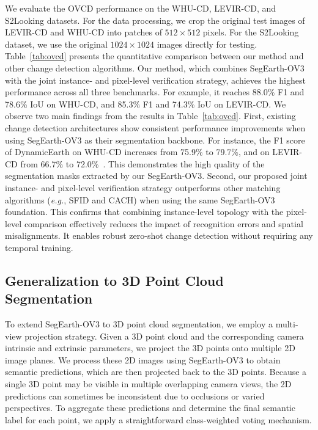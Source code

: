 \documentclass[twocolumn,switch,times]{article}
\newcommand{\samov}{SegEarth-OV\textcolor{cvprpink}{3}\xspace}
\begin{document}
We evaluate the OVCD performance on the WHU-CD, LEVIR-CD, and S2Looking datasets. For the data processing, we crop the original test images of LEVIR-CD and WHU-CD into patches of $512 \times 512$ pixels. For the S2Looking dataset, we use the original $1024 \times 1024$ images directly for testing. Table~\ref{tab:ovcd} presents the quantitative comparison between our method and other change detection algorithms. Our method, which combines \samov with the joint instance- and pixel-level verification strategy, achieves the highest performance across all three benchmarks. For example, it reaches 88.0\% F1 and 78.6\% IoU on WHU-CD, and 85.3\% F1 and 74.3\% IoU on LEVIR-CD.
We observe two main findings from the results in Table~\ref{tab:ovcd}. First, existing change detection architectures show consistent performance improvements when using \samov as their segmentation backbone. For instance, the F1 score of DynamicEarth on WHU-CD increases from 75.9\% to 79.7\%, and on LEVIR-CD from 66.7\% to 72.0\%~\citep{su2026seg2change}. This demonstrates the high quality of the segmentation masks extracted by our \samov. Second, our proposed joint instance- and pixel-level verification strategy outperforms other matching algorithms (\textit{e.g.}, SFID and CACH) when using the same \samov foundation. This confirms that combining instance-level topology with the pixel-level comparison effectively reduces the impact of recognition errors and spatial misalignments. It enables robust zero-shot change detection without requiring any temporal training.


\subsection{Generalization to 3D Point Cloud Segmentation}

To extend \samov to 3D point cloud segmentation, we employ a multi-view projection strategy. Given a 3D point cloud and the corresponding camera intrinsic and extrinsic parameters, we project the 3D points onto multiple 2D image planes. We process these 2D images using \samov to obtain semantic predictions, which are then projected back to the 3D points. Because a single 3D point may be visible in multiple overlapping camera views, the 2D predictions can sometimes be inconsistent due to occlusions or varied perspectives. To aggregate these predictions and determine the final semantic label for each point, we apply a straightforward class-weighted voting mechanism.
\end{document}
